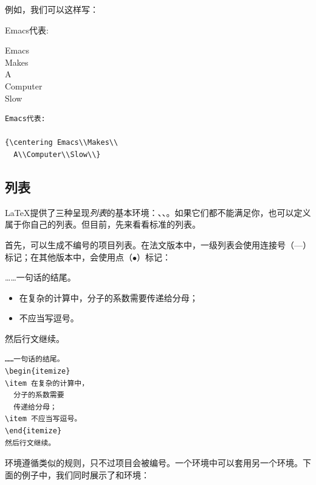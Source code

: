 例如，我们可以这样写：

\begin{codelist}[2.7]{
    Emacs代表:

    {\centering Emacs\\Makes\\
      A\\Computer\\Slow\\}
}{\begin{verbatim}Emacs代表:

{\centering Emacs\\Makes\\
  A\\Computer\\Slow\\}
\end{verbatim}
}
\end{codelist}

\subsection{列表}

\LaTeX 提供了三种呈现\emph{列表}的基本环境：、、。如果它们都不能满足你，也可以定义属于你自己的列表。但目前，先来看看标准的列表。

首先，可以生成不编号的项目列表。在法文版本中，一级列表会使用连接号（---）标记；在其他版本中，会使用点（$\bullet$）标记：

\begin{codelist}[2.8]{
……一句话的结尾。
\begin{itemize}
\item 在复杂的计算中，分子的系数需要传递给分母；
\item 不应当写逗号。
\end{itemize}
然后行文继续。
}\begin{verbatim}
……一句话的结尾。
\begin{itemize}
\item 在复杂的计算中，
  分子的系数需要
  传递给分母；
\item 不应当写逗号。
\end{itemize}
然后行文继续。
\end{verbatim}
\end{codelist}

环境遵循类似的规则，只不过项目会被编号。一个环境中可以套用另一个环境。下面的例子中，我们同时展示了和环境：

